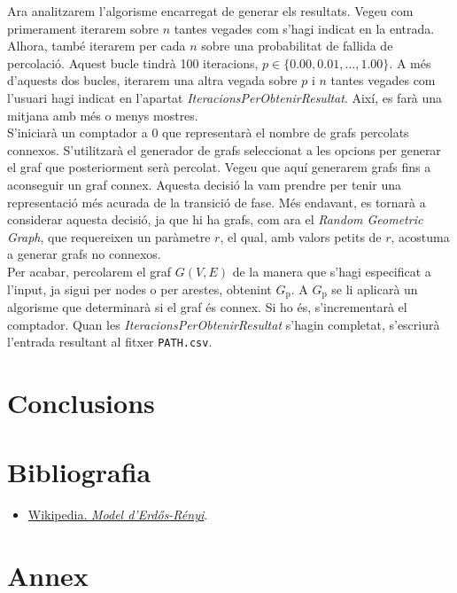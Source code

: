 \documentclass[a4paper]{article}
\begin{document}
	Ara analitzarem l'algorisme encarregat de generar els resultats. Vegeu com primerament iterarem sobre $n$ tantes vegades com s'hagi indicat en la entrada. Alhora, també iterarem per cada $n$ sobre una probabilitat de fallida de percolació. Aquest bucle tindrà 100 iteracions, $p \in \{0.00, 0.01, \dots, 1.00\}$. A més d'aquests dos bucles, iterarem una altra vegada sobre $p$ i $n$ tantes vegades com l'usuari hagi indicat en l'apartat \textit{IteracionsPerObtenirResultat}. Així, es farà una mitjana amb més o menys mostres. \\
	
	S'iniciarà un comptador a 0 que representarà el nombre de grafs percolats connexos. S'utilitzarà el generador de grafs seleccionat a les opcions per generar el graf que posteriorment serà percolat. Vegeu que aquí generarem grafs fins a aconseguir un graf connex. Aquesta decisió la vam prendre per tenir una representació més acurada de la transició de fase. Més endavant, es tornarà a considerar aquesta decisió, ja que hi ha grafs, com ara el \textit{Random Geometric Graph}, que requereixen un paràmetre $r$, el qual, amb valors petits de $r$, acostuma a generar grafs no connexos. \\
	
	Per acabar, percolarem el graf $G(V,E)$ de la manera que s'hagi especificat a l'input, ja sigui per nodes o per arestes, obtenint $G_{\text{p}}$. A $G_{\text{p}}$ se li aplicarà un algorisme que determinarà si el graf és connex. Si ho és, s'incrementarà el comptador. Quan les \textit{IteracionsPerObtenirResultat} s'hagin completat, s'escriurà l'entrada resultant al fitxer \texttt{PATH.csv}.
	
	
	\newpage
	\section{Conclusions}
	
	\newpage
	\section{Bibliografia}
	
	\begin{itemize}
		\item \href{https://ca.wikipedia.org/wiki/Model_d%27Erd%C5%91s-R%C3%A9nyi}{Wikipedia. \textit{Model d'Erdős-Rényi}}.
	\end{itemize}
	
	\newpage
	\section{Annex}
	
	
	
\end{document}
